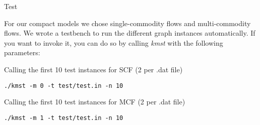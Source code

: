 \documentclass{article}
\begin{document}
\sloppy


\clearpage

Test

For our compact models we chose single-commodity flows and multi-commodity flows. We wrote a testbench to run the different graph instances automatically. If you want to invoke it, you can do so by calling \textit{kmst} with the following parameters:

\hspace{0.5cm}

Calling the first 10 test instances for SCF (2 per .dat file)
\begin{lstlisting}
./kmst -m 0 -t test/test.in -n 10 
\end{lstlisting}

Calling the first 10 test instances for MCF (2 per .dat file)
\begin{lstlisting}
./kmst -m 1 -t test/test.in -n 10 
\end{lstlisting}







\clearpage
\end{document}
